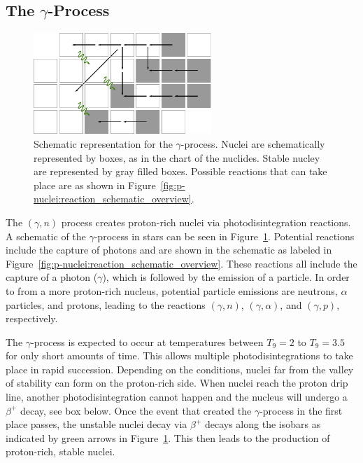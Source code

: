 \subsection{\protect\boldmath The \texorpdfstring{$\gamma$}{gamma}-Process}
\begin{figure}[tb]
    \centering
    \includegraphics[width=0.6\textwidth]{graphics/p-nuclei/gamma_process}
    \caption{Schematic representation for the $\gamma$-process. Nuclei are schematically represented by boxes, as in the chart of the nuclides. Stable nucley are represented by gray filled boxes. Possible reactions that can take place are as shown in Figure~\ref{fig:p-nuclei:reaction_schematic_overview}.}
    \label{fig:p-nulcie:gamma_process}
\end{figure}
The $(\gamma, n)$ process creates proton-rich nuclei via photodisintegration reactions. A schematic of the $\gamma$-process in stars can be seen in Figure~\ref{fig:p-nulcie:gamma_process}. Potential reactions include the capture of photons and are shown in the schematic as labeled in Figure~\ref{fig:p-nuclei:reaction_schematic_overview}. These reactions all include the capture of a photon ($\gamma$), which is followed by the emission of a particle. In order to from a more proton-rich nucleus, potential particle emissions are neutrons, $\alpha$ particles, and protons, leading to the reactions $(\gamma, n)$, $(\gamma, \alpha)$, and $(\gamma, p)$, respectively. 

The $\gamma$-process is expected to occur at temperatures between $T_9 = 2$ to $T_9=3.5$ for only short amounts of time. This allows multiple photodisintegrations to take place in rapid succession. Depending on the conditions, nuclei far from the valley of stability can form on the proton-rich side. When nuclei reach the proton drip line, another photodisintegration cannot happen and the nucleus will undergo a $\beta^{+}$ decay, see box below. Once the event that created the $\gamma$-process in the first place passes, the unstable nuclei decay via $\beta^{+}$ decays along the isobars as indicated by green arrows in Figure~\ref{fig:p-nulcie:gamma_process}. This then leads to the production of proton-rich, stable nuclei.

